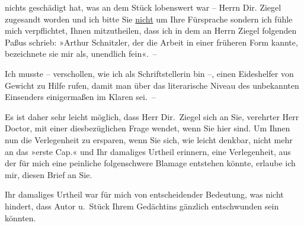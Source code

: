                nichts geschädigt hat, was an dem Stück lobenswert war – Herrn Dir. Ziegel zugesandt worden und ich bitte Sie \uline{nicht} um Ihre Fürsprache sondern ich fühle mich verpflichtet, Ihnen
               mitzutheilen, dass ich in dem \label{K_L03729-5v}\label{K_L03729-5} an Herrn Ziegel
               folgenden Paßus schrieb: »Arthur Schnitzler,
               der die Arbeit in einer
               früheren Form kannte, bezeichnete sie mir als, unendlich fein«. –\pend
           
\pstart
           Ich musste – verschollen, wie ich als Schriftstellerin bin –, einen Eideshelfer von
               Gewicht zu Hilfe rufen, damit man über das literarische Niveau des unbekannten
               Einsenders einigermaßen im Klaren sei. –\pend
           
\pstart
           Es ist daher sehr leicht möglich, dass Herr Dir. Ziegel sich an Sie, verehrter Herr Doctor, mit einer dies{\pb}bezüglichen Frage wendet, wenn Sie hier sind. Um Ihnen nun die Verlegenheit zu
               ersparen, wenn Sie sich, wie leicht denkbar, nicht mehr an das »erste Cap.« und Ihr damaliges Urtheil erinnern, eine
               Verlegenheit, aus der für mich eine peinliche folgenschwere Blamage entstehen könnte,
               erlaube ich mir, diesen Brief an Sie.\pend
           
\pstart
           Ihr damaliges Urtheil war für mich von entscheidender Bedeutung, was nicht hindert,
               dass Autor u. Stück Ihrem
               Gedächtins gänzlich entschwunden sein könnten.\pend
           
